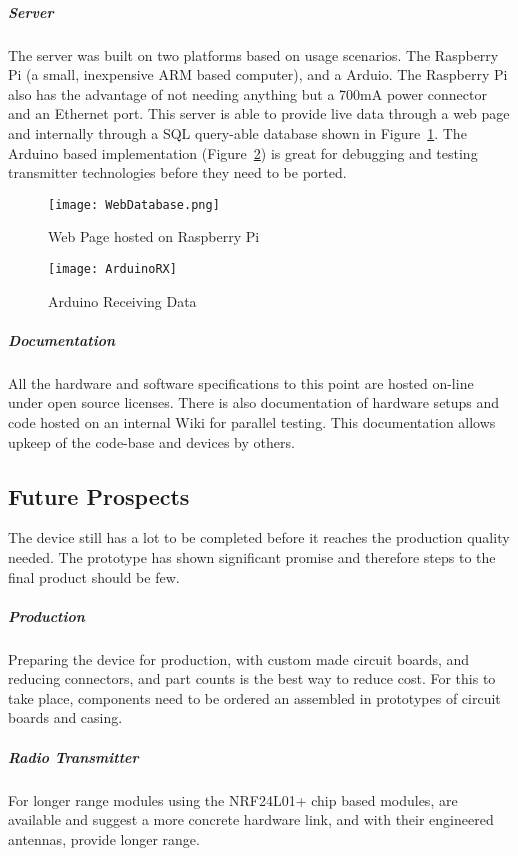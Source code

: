\documentclass[10pt]{article}
\begin{document}
\subparagraph{Server}

The server was built on two platforms based on usage scenarios. The Raspberry Pi (a small, inexpensive ARM based computer), and a Arduio. The Raspberry Pi also has the advantage of not needing anything but a 700mA power connector and an Ethernet port. This server is able to provide live data through a web page and internally through a SQL query-able database shown in Figure~\ref{webPage}. The Arduino based implementation (Figure~\ref{arduinorx}) is great for debugging and testing transmitter technologies before they need to be ported.

\begin{figure}[h]
	\centering
	\texttt{[image: WebDatabase.png]}
	\caption{Web Page hosted on Raspberry Pi \label{webPage}}
\end{figure}

\begin{figure}[h]
	\centering
	\texttt{[image: ArduinoRX]}
	\caption{Arduino Receiving Data \label{arduinorx}}
\end{figure}

\subparagraph{Documentation}
All the hardware and software specifications to this point are hosted on-line under open source licenses. There is also documentation of hardware setups and code hosted on an internal Wiki for parallel testing. This documentation allows upkeep of the code-base and devices by others.

\subsection*{Future Prospects}
The device still has a lot to be completed before it reaches the production quality needed. The prototype has shown significant promise and therefore steps to the final product should be few.

\subparagraph{Production}
Preparing the device for production, with custom made circuit boards, and reducing connectors, and part counts is the best way to reduce cost. For this to take place, components need to be ordered an assembled in prototypes of circuit boards and casing.

\subparagraph{Radio Transmitter}

For longer range modules using the NRF24L01+ chip based modules, are available and suggest a more concrete hardware link, and with their engineered antennas, provide longer range.

\pagebreak


\end{document}
